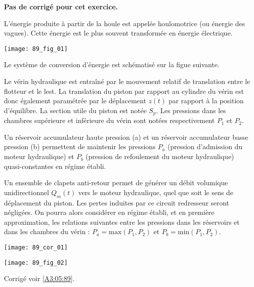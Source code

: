 \normaltrue \difficilefalse \tdifficilefalse
\correctionfalse

\setcounter{question}{0}
\ifcorrection
\else
\textbf{Pas de corrigé pour cet exercice.}
\fi



\ifprof
\else
L’énergie produite à partir de la houle est appelée houlomotrice (ou énergie des vagues). Cette énergie est le plus souvent
transformée en énergie électrique.

\begin{center}
\texttt{[image: 89\_fig\_01]}
\end{center}

Le système de conversion d'énergie est schématisé sur la figue suivante.

Le vérin hydraulique est entraîné par le mouvement relatif de translation entre le flotteur et le lest.
La translation du piston par rapport au cylindre du vérin est donc également paramétrée par le
déplacement $z(t)$ par rapport à la position d’équilibre. La section utile du piston est notée $S_p$. Les
pressions dans les chambres supérieure et inférieure du vérin sont notées respectivement $P_1$ et $P_2$.

Un réservoir accumulateur haute pression (a) et un réservoir accumulateur basse pression (b)
permettent de maintenir les pressions $P_a$ (pression d'admission du moteur hydraulique) et $P_b$
(pression de refoulement du moteur hydraulique) quasi-constantes en régime établi.

Un ensemble de clapets anti-retour permet de générer un débit volumique unidirectionnel $Q_m(t)$
vers le moteur hydraulique, quel que soit le sens de déplacement du piston. Les pertes induites par
ce circuit redresseur seront négligées. On pourra alors considérer en régime établi, et en première
approximation, les relations suivantes entre les pressions dans les réservoirs et dans les chambres du
vérin : $P_a = \text{max} \left(P_1,P_2\right)$ et $P_b = \text{min} \left(P_1,P_2\right)$.

\fi


\ifprof
\begin{corrige}
\begin{center}
\texttt{[image: 89\_cor\_01]}
\end{center}
\end{corrige}
\else

\begin{center}
\texttt{[image: 89\_fig\_02]}
\end{center}
\fi

\ifprof
\else
\begin{flushright}
\footnotesize{Corrigé  voir \ref{A3:05:89}.}
\end{flushright}%
\fi
